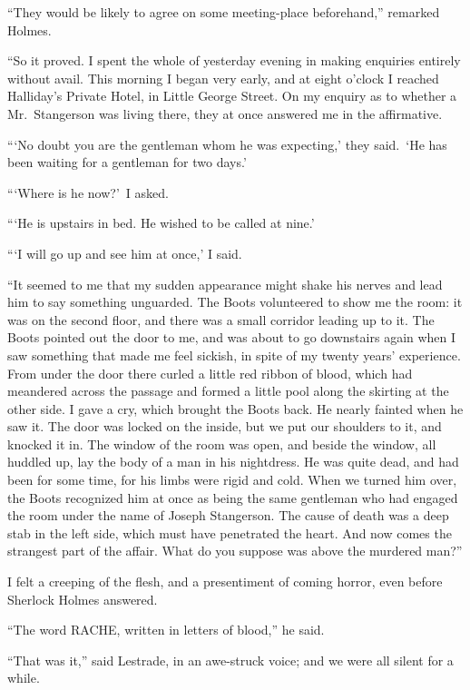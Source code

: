 \documentclass[12pt,english,oneside]{book}
\begin{document}
{}``They would be likely to agree on some meeting-place beforehand,''
remarked Holmes.

{}``So it proved. I spent the whole of yesterday evening in making
enquiries entirely without avail. This morning I began very early,
and at eight o'clock I reached Halliday's Private Hotel, in Little
George Street. On my enquiry as to whether a Mr.\ Stangerson was
living there, they at once answered me in the affirmative.

{}```No doubt you are the gentleman whom he was expecting,' they
said.\  `He has been waiting for a gentleman for two days.'

{}```Where is he now?'\ I asked.

{}```He is upstairs in bed. He wished to be called at nine.'

{}```I will go up and see him at once,' I said.

{}``It seemed to me that my sudden appearance might shake his nerves
and lead him to say something unguarded. The Boots volunteered to
show me the room: it was on the second floor, and there was a small
corridor leading up to it. The Boots pointed out the door to me, and
was about to go downstairs again when I saw something that made me
feel sickish, in spite of my twenty years' experience. From under
the door there curled a little red ribbon of blood, which had meandered
across the passage and formed a little pool along the skirting at
the other side. I gave a cry, which brought the Boots back. He nearly
fainted when he saw it. The door was locked on the inside, but we
put our shoulders to it, and knocked it in. The window of the room
was open, and beside the window, all huddled up, lay the body of a
man in his nightdress. He was quite dead, and had been for some time,
for his limbs were rigid and cold. When we turned him over, the Boots
recognized him at once as being the same gentleman who had engaged
the room under the name of Joseph Stangerson. The cause of death was
a deep stab in the left side, which must have penetrated the heart.
And now comes the strangest part of the affair. What do you suppose
was above the murdered man?''

I felt a creeping of the flesh, and a presentiment of coming horror,
even before Sherlock Holmes answered.

{}``The word RACHE, written in letters of blood,'' he said.

{}``That was it,'' said Lestrade, in an awe-struck voice; and we
were all silent for a while.
\end{document}
